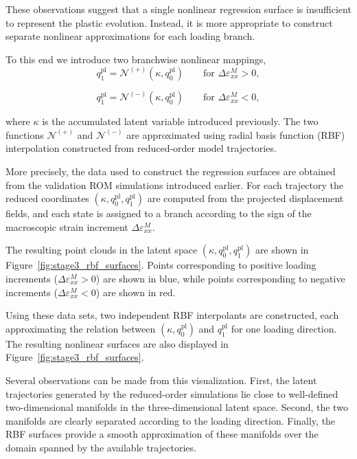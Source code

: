 \documentclass[11pt,a4paper]{article}
\begin{document}
These observations suggest that a single nonlinear regression surface is insufficient to represent the plastic evolution. Instead, it is more appropriate to construct separate nonlinear approximations for each loading branch.

To this end we introduce two branchwise nonlinear mappings,
\[
q^{\mathrm{pl}}_1
=
\mathcal{N}^{(+)}(\kappa, q^{\mathrm{pl}}_0)
\qquad \text{for } \Delta \varepsilon_{xx}^{M} > 0,
\]

\[
q^{\mathrm{pl}}_1
=
\mathcal{N}^{(-)}(\kappa, q^{\mathrm{pl}}_0)
\qquad \text{for } \Delta \varepsilon_{xx}^{M} < 0,
\]

where $\kappa$ is the accumulated latent variable introduced previously. 
The two functions $\mathcal{N}^{(+)}$ and $\mathcal{N}^{(-)}$ are approximated using radial basis function (RBF) interpolation constructed from reduced-order model trajectories.

More precisely, the data used to construct the regression surfaces are obtained from the validation ROM simulations introduced earlier. For each trajectory the reduced coordinates $(\kappa,q^{\mathrm{pl}}_0,q^{\mathrm{pl}}_1)$ are computed from the projected displacement fields, and each state is assigned to a branch according to the sign of the macroscopic strain increment $\Delta \varepsilon_{xx}^{M}$.

The resulting point clouds in the latent space $(\kappa,q^{\mathrm{pl}}_0,q^{\mathrm{pl}}_1)$ are shown in Figure~\ref{fig:stage3_rbf_surfaces}. 
Points corresponding to positive loading increments ($\Delta \varepsilon_{xx}^{M}>0$) are shown in blue, while points corresponding to negative increments ($\Delta \varepsilon_{xx}^{M}<0$) are shown in red. 

Using these data sets, two independent RBF interpolants are constructed, each approximating the relation between $(\kappa,q^{\mathrm{pl}}_0)$ and $q^{\mathrm{pl}}_1$ for one loading direction. The resulting nonlinear surfaces are also displayed in Figure~\ref{fig:stage3_rbf_surfaces}. 

Several observations can be made from this visualization. 
First, the latent trajectories generated by the reduced-order simulations lie close to well-defined two-dimensional manifolds in the three-dimensional latent space. 
Second, the two manifolds are clearly separated according to the loading direction. 
Finally, the RBF surfaces provide a smooth approximation of these manifolds over the domain spanned by the available trajectories.
\end{document}
